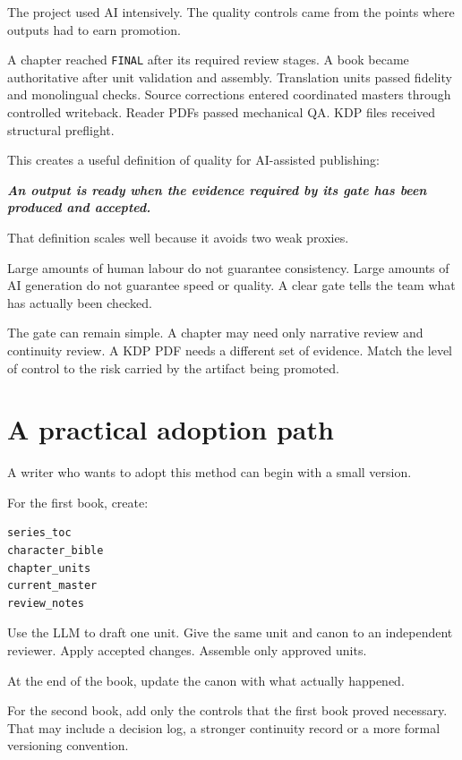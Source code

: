 \documentclass[11pt,oneside,openany]{book}
\newcommand{\passthrough}[1]{#1}
\renewenvironment{quote}{\begin{insightbox}\itshape}{\end{insightbox}}
\begin{document}
The project used AI intensively. The quality controls came from the points where outputs had to earn promotion.

A chapter reached \passthrough{\lstinline!FINAL!} after its required review stages. A book became authoritative after unit validation and assembly. Translation units passed fidelity and monolingual checks. Source corrections entered coordinated masters through controlled writeback. Reader PDFs passed mechanical QA. KDP files received structural preflight.

This creates a useful definition of quality for AI-assisted publishing:

\begin{quote}
\textbf{An output is ready when the evidence required by its gate has been produced and accepted.}
\end{quote}

That definition scales well because it avoids two weak proxies.

Large amounts of human labour do not guarantee consistency. Large amounts of AI generation do not guarantee speed or quality. A clear gate tells the team what has actually been checked.

The gate can remain simple. A chapter may need only narrative review and continuity review. A KDP PDF needs a different set of evidence. Match the level of control to the risk carried by the artifact being promoted.

\chapter{A practical adoption path}\label{a-practical-adoption-path}

A writer who wants to adopt this method can begin with a small version.

For the first book, create:

\begin{lstlisting}
series_toc
character_bible
chapter_units
current_master
review_notes
\end{lstlisting}

Use the LLM to draft one unit. Give the same unit and canon to an independent reviewer. Apply accepted changes. Assemble only approved units.

At the end of the book, update the canon with what actually happened.

For the second book, add only the controls that the first book proved necessary. That may include a decision log, a stronger continuity record or a more formal versioning convention.
\end{document}
